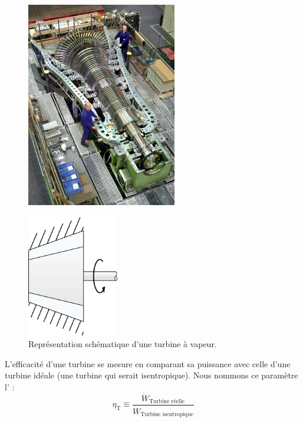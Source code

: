 		\begin{figure}
			\begin{center}
				\includegraphics[height=9cm]{images/centrale_turbine_photo.jpg}
			\end{center}
			\label{fig_centrale_turbine1}
		\end{figure}

		\begin{figure}
			\begin{center}
				\includegraphics[width=4cm]{images/symbole_turbine.png}
			\end{center}
			\caption{Représentation schématique d’une turbine à vapeur.}
			\label{fig_centrale_turbine2}
		\end{figure}
		

		L’efficacité d’une turbine se mesure en comparant sa puissance avec celle d’une turbine idéale (une turbine qui serait isentropique). Nous nommons ce paramètre l’ :
		\begin{equation}
			\eta_\text{T} \equiv  \frac{\dot{W}_\text{Turbine réelle}}{\dot{W}_\text{Turbine isentropique}}
			\label{def_efficacité_isentropique_turbine}
		\end{equation}
		
